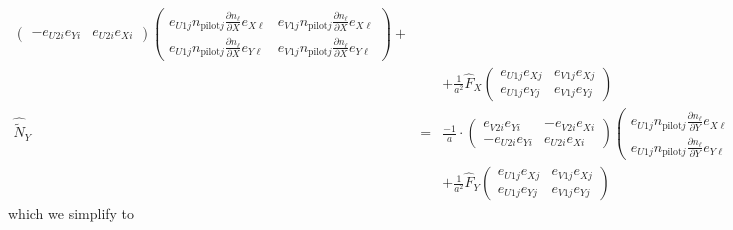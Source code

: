 \documentclass[12pt,a4paper,twoside,openright,BCOR10mm,headsepline,titlepage,abstracton,chapterprefix,final]{scrreprt}
\newcommand\pilot{\textrm{pilot}}
\begin{document}
\begin{eqnarray}
\begin{pmatrix}
      -e_{U2i} e_{Yi}  & e_{U2i} e_{Xi}
     \end{pmatrix}
     \begin{pmatrix}
       e_{U1j} n_{\pilot j} \frac{\partial n_\ell}{\partial X} e_{X\ell} &  e_{V1j} n_{\pilot j} \frac{\partial n_\ell}{\partial X} e_{X\ell}
       \\
       e_{U1j} n_{\pilot j} \frac{\partial n_\ell}{\partial X} e_{Y\ell} &  e_{V1j} n_{\pilot j} \frac{\partial n_\ell}{\partial X} e_{Y\ell}
     \end{pmatrix} +
  \nonumber\\
  &&+
  \frac{1}{a^2}
  \hat{F}_X
   \begin{pmatrix}
  e_{U1j} e_{Xj} &  e_{V1j} e_{Xj}
   \\
  e_{U1j} e_{Yj} &  e_{V1j} e_{Yj}
 \end{pmatrix}
  \\
  \hat{\tilde{N}}_Y
  &=&
     \frac{ -1 }{ a }
     \cdot
     \begin{pmatrix}
       e_{V2i} e_{Yi} & -e_{V2i} e_{Xi}
       \\
      -e_{U2i} e_{Yi}  & e_{U2i} e_{Xi}
     \end{pmatrix}
     \begin{pmatrix}
       e_{U1j} n_{\pilot j} \frac{\partial n_\ell}{\partial Y} e_{X\ell} &  e_{V1j} n_{\pilot j} \frac{\partial n_\ell}{\partial Y} e_{X\ell}
       \\
       e_{U1j} n_{\pilot j} \frac{\partial n_\ell}{\partial Y} e_{Y\ell} &  e_{V1j} n_{\pilot j} \frac{\partial n_\ell}{\partial Y} e_{Y\ell}
     \end{pmatrix} +
  \nonumber\\
  &&+
  \frac{1}{a^2}
  \hat{F}_Y
   \begin{pmatrix}
  e_{U1j} e_{Xj} &  e_{V1j} e_{Xj}
   \\
  e_{U1j} e_{Yj} &  e_{V1j} e_{Yj}
 \end{pmatrix}
\end{eqnarray}
which we simplify to
\end{document}
